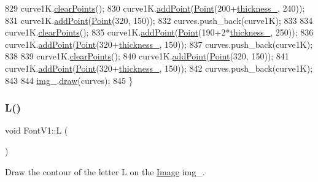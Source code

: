 \begin{DoxyCode}
829     curve1K.\mbox{\hyperlink{class_bezier_curve_a0ba8ce66d5af5971ae6a1b506029728e}{clearPoints}}();
830     curve1K.\mbox{\hyperlink{class_bezier_curve_a38d16c18b36ae45619b05e26e226cf34}{addPoint}}(\mbox{\hyperlink{class_point}{Point}}(200+\mbox{\hyperlink{class_font_v1_aed8040e76be9a52833627b92f0fb4e5f}{thickness\_}}, 240));
831     curve1K.\mbox{\hyperlink{class_bezier_curve_a38d16c18b36ae45619b05e26e226cf34}{addPoint}}(\mbox{\hyperlink{class_point}{Point}}(320, 150));
832     curves.push\_back(curve1K);
833 
834     curve1K.\mbox{\hyperlink{class_bezier_curve_a0ba8ce66d5af5971ae6a1b506029728e}{clearPoints}}();
835     curve1K.\mbox{\hyperlink{class_bezier_curve_a38d16c18b36ae45619b05e26e226cf34}{addPoint}}(\mbox{\hyperlink{class_point}{Point}}(190+2*\mbox{\hyperlink{class_font_v1_aed8040e76be9a52833627b92f0fb4e5f}{thickness\_}}, 250));
836     curve1K.\mbox{\hyperlink{class_bezier_curve_a38d16c18b36ae45619b05e26e226cf34}{addPoint}}(\mbox{\hyperlink{class_point}{Point}}(320+\mbox{\hyperlink{class_font_v1_aed8040e76be9a52833627b92f0fb4e5f}{thickness\_}}, 150));
837     curves.push\_back(curve1K);
838 
839     curve1K.\mbox{\hyperlink{class_bezier_curve_a0ba8ce66d5af5971ae6a1b506029728e}{clearPoints}}();
840     curve1K.\mbox{\hyperlink{class_bezier_curve_a38d16c18b36ae45619b05e26e226cf34}{addPoint}}(\mbox{\hyperlink{class_point}{Point}}(320, 150));
841     curve1K.\mbox{\hyperlink{class_bezier_curve_a38d16c18b36ae45619b05e26e226cf34}{addPoint}}(\mbox{\hyperlink{class_point}{Point}}(320+\mbox{\hyperlink{class_font_v1_aed8040e76be9a52833627b92f0fb4e5f}{thickness\_}}, 150));
842     curves.push\_back(curve1K);
843 
844     \mbox{\hyperlink{class_font_v1_a00569e3e3c4b70f437b63f396f735fb0}{img\_}}.\mbox{\hyperlink{class_image_a8d162f3cab956131d58708c09aa560b0}{draw}}(curves);
845 \}
\end{DoxyCode}
\mbox{\label{class_font_v1_a17ba426bfb42af35ea882ab3beeba734}} 
\subsubsection{\texorpdfstring{L()}{L()}}
{\footnotesize\ttfamily void Font\+V1\+::L (\begin{DoxyParamCaption}{ }\end{DoxyParamCaption})}



Draw the contour of the letter L on the \mbox{\hyperlink{class_image}{Image}} img\+\_\+. 


